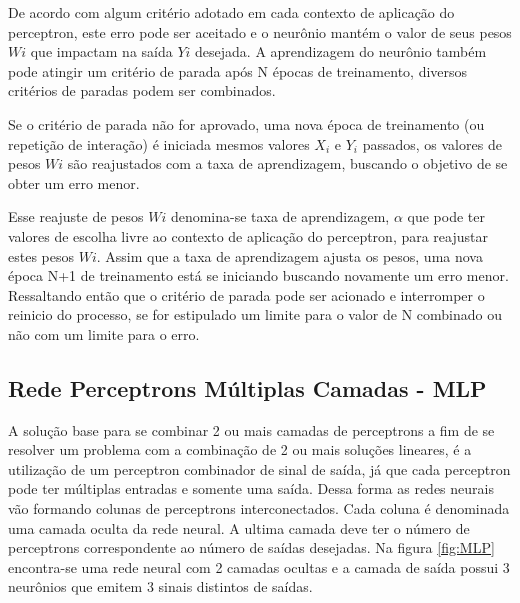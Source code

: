     De acordo com algum critério adotado em cada contexto de aplicação do perceptron, este erro pode ser aceitado e o neurônio mantém o valor de seus pesos $Wi$ que impactam na saída $Yi$ desejada. A aprendizagem do neurônio também pode atingir um critério de parada após N épocas de treinamento, diversos critérios de paradas  podem ser combinados.  
                	
    Se o critério de parada não for aprovado, uma nova época de treinamento (ou repetição de interação) é iniciada mesmos valores $X_i$ e $Y_i$ passados, os valores de pesos $Wi$ são reajustados com a taxa de aprendizagem, buscando o objetivo de se obter um erro menor.
                	
    Esse reajuste de pesos $Wi$ denomina-se taxa de aprendizagem, $\alpha$ que pode ter valores de escolha livre ao contexto de aplicação do perceptron, para reajustar estes pesos $Wi$. Assim que a taxa de aprendizagem ajusta os pesos, uma nova época N+1 de treinamento está se iniciando buscando novamente um erro menor. Ressaltando então que o critério de parada pode ser acionado e interromper o reinicio do processo, se for estipulado um limite para o valor de N combinado ou não com um limite para o erro. 
            	
    \subsection{Rede Perceptrons Múltiplas Camadas - MLP}

    A solução base para se combinar 2 ou mais camadas de perceptrons a fim de se resolver um problema com a combinação de 2 ou mais soluções lineares, é a utilização de um perceptron combinador de sinal de saída, já que cada perceptron pode ter múltiplas entradas e somente uma saída. Dessa forma as redes neurais vão formando colunas de perceptrons interconectados. Cada coluna é denominada uma camada oculta da rede neural. A ultima camada deve ter o número de perceptrons correspondente ao número de saídas desejadas. Na figura \ref{fig:MLP} encontra-se uma rede neural com 2 camadas ocultas e a camada de saída possui 3 neurônios que emitem 3 sinais distintos de saídas.
    
    \begin{figure}[H]
    \end{figure}
    
